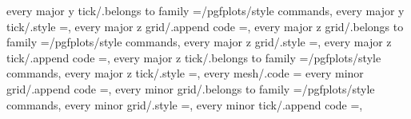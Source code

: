 {{{{{{{{every major y tick/.belongs to family                              =/pgfplots/style commands,                                                                                                          
every major y tick/.style                                          ={},                                                                                                                                
every major z grid/.append code                                    ={},                                                                         
every major z grid/.belongs to family                              =/pgfplots/style commands,                                                                                                          
every major z grid/.style                                          ={},                                                                                                                                
every major z tick/.append code                                    ={},                                                                         
every major z tick/.belongs to family                              =/pgfplots/style commands,                                                                                                          
every major z tick/.style                                          ={},                                                                                                                                
every mesh/.code                                                   ={%
every minor grid/.append code                                      ={},                                                                           
every minor grid/.belongs to family                                =/pgfplots/style commands,                                                                                                          
every minor grid/.style                                            ={},                                                                                                                                
every minor tick/.append code                                      ={},                                                                           
}}}}}}}}}
